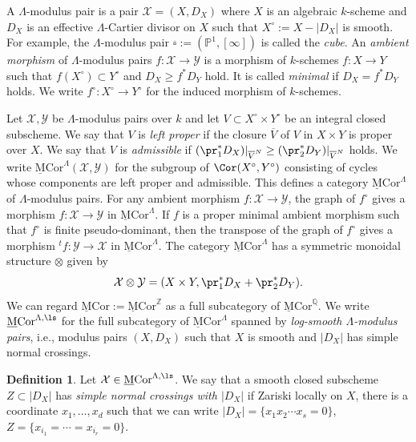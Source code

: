 \documentclass{amsart}
\theoremstyle{plain}
\theoremstyle{definition}
\newtheorem{definition}[theorem]{Definition}
\theoremstyle{remark}
\numberwithin{equation}{section}
\def\bcube{{\overline{\square}}}
\def\MCor{\mathrm{\underline{M}Cor}}
\begin{document}
A $\Lambda$-modulus pair is a pair $\mathcal{X}=(X,D_X)$ where $X$ is an algebraic $k$-scheme and $D_X$ is an effective $\Lambda$-Cartier divisor on $X$ such that $X^\circ:=X-|D_X|$ is smooth.
For example, the $\Lambda$-modulus pair $\bcube:=(\mathbb{P}^1,[\infty])$ is called the \emph{cube}.
An \emph{ambient morphism} of $\Lambda$-modulus pairs $f\colon \mathcal{X}\to \mathcal{Y}$ is a morphism of $k$-schemes $f\colon X\to Y$ such that $f(X^\circ)\subset Y^\circ$ and $D_X\geq f^*D_Y$ hold.
It is called \emph{minimal} if $D_X=f^*D_Y$ holds.
We write $f^\circ\colon X^\circ\to Y^\circ$ for the induced morphism of $k$-schemes.

Let $\mathcal{X},\mathcal{Y}$ be $\Lambda$-modulus pairs over $k$ and let $V\subset X^\circ\times Y^\circ$ be an integral closed subscheme.
We say that $V$ is \emph{left proper} if the closure $\overline{V}$ of $V$ in $X\times Y$ is proper over $X$.
We say that $V$ is \emph{admissible} if $(\pr_1^*D_X)|_{\overline{V}^N}\geq (\pr_2^*D_Y)|_{\overline{V}^N}$ holds.
We write $\MCor^\Lambda(\mathcal{X},\mathcal{Y})$ for the subgroup of $\Cor(X^\circ,Y^\circ)$ consisting of cycles whose components are left proper and admissible.
This defines a category $\MCor^\Lambda$ of $\Lambda$-modulus pairs.
For any ambient morphism $f\colon \mathcal{X}\to \mathcal{Y}$, the graph of $f^\circ$ gives a morphism $f\colon \mathcal{X}\to \mathcal{Y}$ in $\MCor^\Lambda$.
If $f$ is a proper minimal ambient morphism such that $f^\circ$ is finite pseudo-dominant, then the transpose of the graph of $f^\circ$ gives a morphism ${}^tf\colon \mathcal{Y}\to \mathcal{X}$ in $\MCor^\Lambda$.
The category $\MCor^\Lambda$ has a symmetric monoidal structure $\otimes$ given by
$$
	\mathcal{X}\otimes \mathcal{Y}=(X\times Y, \pr_1^*D_X+\pr_2^*D_Y).
$$
We can regard $\MCor:=\MCor^\mathbb{Z}$ as a full subcategory of $\MCor^\mathbb{Q}$.
We write $\MCor^{\Lambda,\ls}$ for the full subcategory of $\MCor^\Lambda$ spanned by \emph{log-smooth $\Lambda$-modulus pairs}, i.e., modulus pairs $(X,D_X)$ such that $X$ is smooth and $|D_X|$ has simple normal crossings.

\begin{definition}\label{}
    Let $\mathcal{X}\in \MCor^{\Lambda,\ls}$.
    We say that a smooth closed subscheme $Z\subset |D_X|$ has \emph{simple normal crossings with $|D_X|$} if Zariski locally on $X$, there is a coordinate $x_1,\dots,x_d$ such that we can write $|D_X|=\{x_1x_2\cdots x_s=0\}$, $Z=\{x_{i_1}=\cdots=x_{i_r}=0\}$.
\end{definition}
\end{document}
